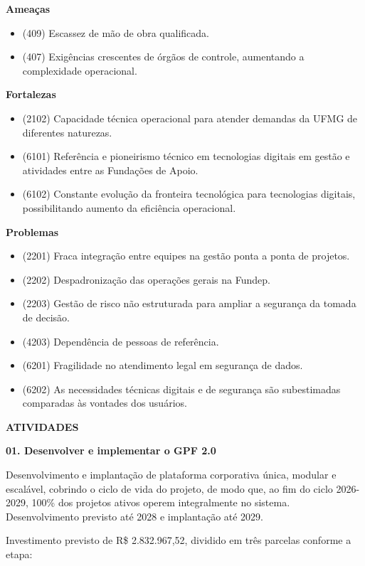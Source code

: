 \documentclass[12pt,a4paper]{article}
\newcommand{\secao}[1]{%
  \par\vspace{6pt}%
  {\noindent\bfseries\color{azulTitulo}\fontsize{13}{16}\selectfont #1}%
  \par\vspace{2pt}%
}
\newcommand{\atividade}[1]{%
  \par{\bfseries\color{azulAtividade}#1}\par
}
\begin{document}
\textbf{Ameaças}
\begin{itemize}[leftmargin=1.27cm,topsep=0pt,itemsep=2pt,parsep=0pt]
  \item (409) Escassez de mão de obra qualificada.
  \item (407) Exigências crescentes de órgãos de controle, aumentando a complexidade operacional.
\end{itemize}

\textbf{Fortalezas}
\begin{itemize}[leftmargin=1.27cm,topsep=0pt,itemsep=2pt,parsep=0pt]
  \item (2102) Capacidade técnica operacional para atender demandas da UFMG de diferentes naturezas.
  \item (6101) Referência e pioneirismo técnico em tecnologias digitais em gestão e atividades entre as Fundações de Apoio.
  \item (6102) Constante evolução da fronteira tecnológica para tecnologias digitais, possibilitando aumento da eficiência operacional.
\end{itemize}

\textbf{Problemas}
\begin{itemize}[leftmargin=1.27cm,topsep=0pt,itemsep=2pt,parsep=0pt]
  \item (2201) Fraca integração entre equipes na gestão ponta a ponta de projetos.
  \item (2202) Despadronização das operações gerais na Fundep.
  \item (2203) Gestão de risco não estruturada para ampliar a segurança da tomada de decisão.
  \item (4203) Dependência de pessoas de referência.
  \item (6201) Fragilidade no atendimento legal em segurança de dados.
  \item (6202) As necessidades técnicas digitais e de segurança são subestimadas comparadas às vontades dos usuários.
\end{itemize}

\secao{ATIVIDADES}

\atividade{01. Desenvolver e implementar o GPF 2.0}

Desenvolvimento e implantação de plataforma corporativa única, modular e escalável, cobrindo o ciclo de vida do projeto, de modo que, ao fim do ciclo 2026-2029, 100\% dos projetos ativos operem integralmente no sistema. Desenvolvimento previsto até 2028 e implantação até 2029.

Investimento previsto de R\$ 2.832.967,52, dividido em três parcelas conforme a etapa:
\end{document}
